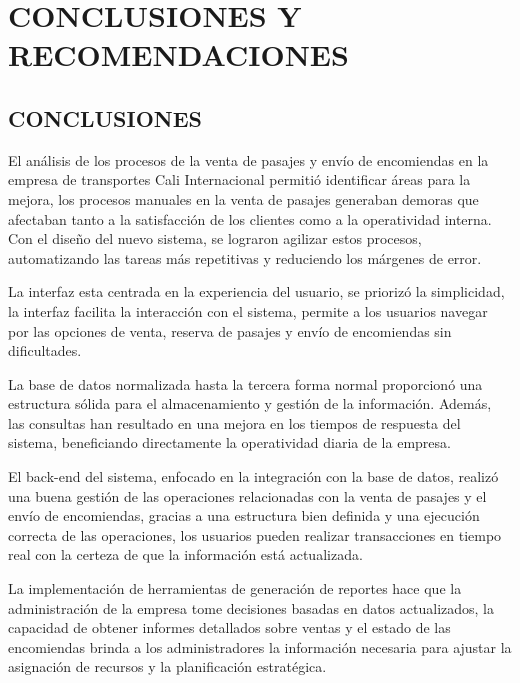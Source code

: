 \chapter{CONCLUSIONES Y RECOMENDACIONES} 
\section{CONCLUSIONES}
	El análisis de los procesos de la venta de pasajes y envío de encomiendas en la empresa de transportes Cali Internacional permitió identificar áreas para la mejora, los procesos manuales en la venta de pasajes generaban demoras que afectaban tanto a la satisfacción de los clientes como a la operatividad interna. Con el diseño del nuevo sistema, se lograron agilizar estos procesos, automatizando las tareas más repetitivas y reduciendo los márgenes de error. 
	
	La interfaz esta centrada en la experiencia del usuario, se priorizó la simplicidad, la interfaz facilita la interacción con el sistema, permite a los usuarios navegar por las opciones de venta, reserva de pasajes y envío de encomiendas sin dificultades.
	
	La base de datos normalizada hasta la tercera forma normal proporcionó una estructura sólida para el almacenamiento y gestión de la información. Además, las consultas han resultado en una mejora en los tiempos de respuesta del sistema, beneficiando directamente la operatividad diaria de la empresa.
	
	El back-end del sistema, enfocado en la integración con la base de datos, realizó una buena gestión de las operaciones relacionadas con la venta de pasajes y el envío de encomiendas, gracias a una estructura bien definida y una ejecución correcta de las operaciones, los usuarios pueden realizar transacciones en tiempo real con la certeza de que la información está actualizada.
	
	La implementación de herramientas de generación de reportes hace que la administración de la empresa tome decisiones basadas en datos actualizados, la capacidad de obtener informes detallados sobre ventas y el estado de las encomiendas brinda a los administradores la información necesaria para ajustar la asignación de recursos y la planificación estratégica. 
	
	
